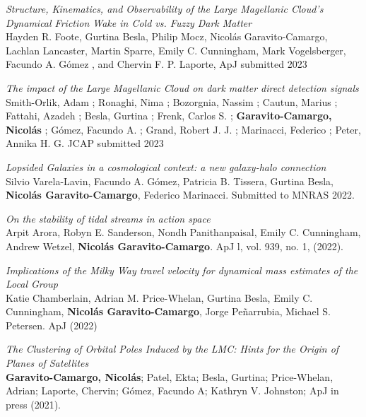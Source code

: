 \documentclass[UTF8]{article}
\begin{document}
\begin{etaremune}
\item \textit{Structure, Kinematics, and Observability of the Large Magellanic
  Cloud's Dynamical Friction Wake in Cold vs. Fuzzy Dark Matter}\\
 Hayden R. Foote, Gurtina Besla, Philip Mocz, Nicol\'as Garavito-Camargo,
 Lachlan Lancaster, Martin Sparre, Emily C. Cunningham, Mark Vogelsberger, Facundo A. Gómez , and Chervin F. P. Laporte, ApJ submitted 2023\\


\item \textit{The impact of the Large Magellanic Cloud on dark matter direct detection signals}\\
 Smith-Orlik, Adam ; Ronaghi, Nima ; Bozorgnia, Nassim ; Cautun, Marius ; Fattahi, Azadeh ; Besla, Gurtina ; Frenk, Carlos S. ; \textbf{Garavito-Camargo, Nicol\'as} ; Gómez, Facundo A. ; Grand, Robert J. J. ; Marinacci, Federico ; Peter, Annika H. G. JCAP submitted 2023\\

\item \textit{Lopsided Galaxies in a cosmological context: a new galaxy-halo connection}\\ 
Silvio Varela-Lavin, Facundo A. Gómez, Patricia B. Tissera, Gurtina Besla, \textbf{Nicolás Garavito-Camargo}, Federico Marinacci. Submitted to MNRAS 2022.\\ 

\item \textit{On the stability of tidal streams in action space}\\
  Arpit Arora, Robyn E. Sanderson, Nondh Panithanpaisal, Emily C. Cunningham, Andrew Wetzel, \textbf{Nicol\'as Garavito-Camargo}. ApJ l, vol. 939, no. 1, (2022). 


\item \textit{Implications of the Milky Way travel velocity for dynamical mass
  estimates of the Local Group}\\
  Katie Chamberlain, Adrian M. Price-Whelan, Gurtina Besla, Emily C. Cunningham, \textbf{Nicol\'as Garavito-Camargo}, Jorge Peñarrubia, Michael S. Petersen. ApJ (2022)\\  

\item \textit{The Clustering of Orbital Poles Induced by the LMC: Hints for
      the Origin of Planes of Satellites}\\ 
      \textbf{Garavito-Camargo, Nicol\'as}; Patel, Ekta; Besla, Gurtina; Price-Whelan,
      Adrian; Laporte, Chervin; G\'omez, Facundo A; Kathryn V. Johnston; ApJ
      in press (2021). 



\end{etaremune}
\end{document}
